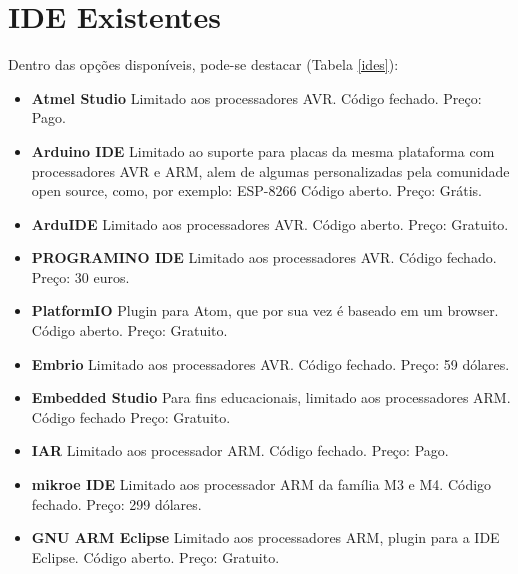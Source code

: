 \section{IDE Existentes}
Dentro das opções disponíveis, pode-se destacar (Tabela \ref{ides}):
\iffalse
\begin{itemize}
 \item \textbf{Atmel Studio}
 \subitem Limitado aos processadores AVR.
 \subitem Código fechado.
 \subitem Preço: Pago.

 \item \textbf{Arduino IDE}
 \subitem Limitado ao suporte para placas da mesma plataforma com processadores AVR e ARM, alem de algumas personalizadas
 pela comunidade open source, como, por exemplo: ESP-8266
 \subitem Código aberto.
 \subitem Preço: Grátis.

 \item \textbf{ArduIDE}
 \subitem Limitado aos processadores AVR.
 \subitem Código aberto.
 \subitem Preço: Gratuito.

 \item \textbf{PROGRAMINO IDE}
 \subitem Limitado aos processadores AVR.
 \subitem Código fechado.
 \subitem Preço: 30 euros.

 \item \textbf{PlatformIO}
 \subitem Plugin para Atom, que por sua vez é baseado em um browser.
 \subitem Código aberto.
 \subitem Preço: Gratuito.

 \item \textbf{Embrio}
 \subitem Limitado aos processadores AVR.
 \subitem Código fechado.
 \subitem Preço: 59 dólares.

 \item \textbf{Embedded Studio}
 \subitem Para fins educacionais, limitado aos processadores ARM.
 \subitem Código fechado
 \subitem Preço: Gratuito.

 \item \textbf{IAR}
 \subitem Limitado aos processador ARM.
 \subitem Código fechado.
 \subitem Preço: Pago.

 \item \textbf{mikroe IDE}
 \subitem Limitado aos processador ARM da família M3 e M4.
 \subitem Código fechado.
 \subitem Preço: 299 dólares.

 \item \textbf{GNU ARM Eclipse}
 \subitem Limitado aos processadores ARM, plugin para a IDE Eclipse.
 \subitem Código aberto.
 \subitem Preço: Gratuito.


\end{itemize}
